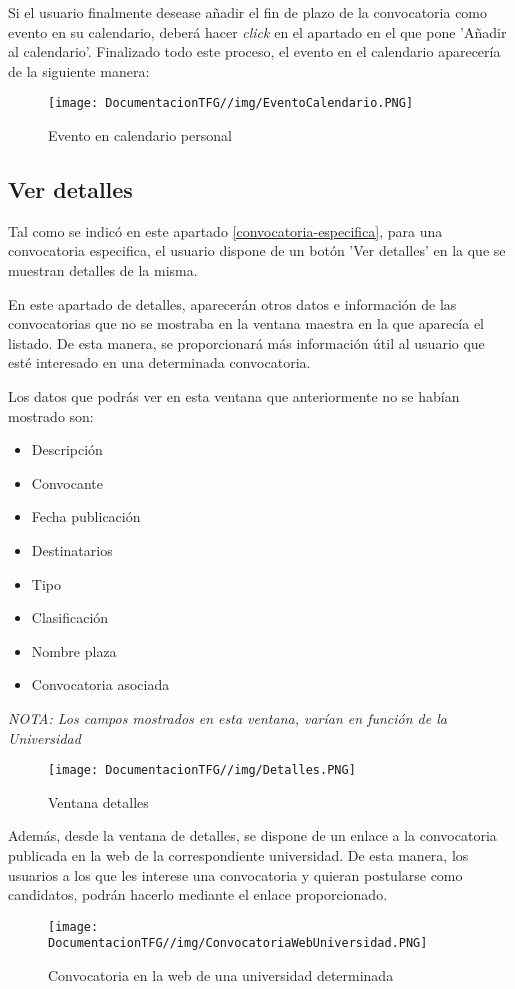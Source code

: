 Si el usuario finalmente desease añadir el fin de plazo de la convocatoria como evento en su calendario, deberá hacer \textit{click} en el apartado en el que pone 'Añadir al calendario'. Finalizado todo este proceso, el evento en el calendario aparecería de la siguiente manera:

\begin{figure}[H]
    \centering
    \texttt{[image: DocumentacionTFG//img/EventoCalendario.PNG]}
    \caption{Evento en calendario personal}
    \label{fig:evento-calendario}
\end{figure}

\subsection{Ver detalles}
Tal como se indicó en este apartado \ref{convocatoria-especifica}, para una convocatoria especifica, el usuario dispone de un botón 'Ver detalles' en la que se muestran detalles de la misma.

En este apartado de detalles, aparecerán otros datos e información de las convocatorias que no se mostraba en la ventana maestra en la que aparecía el listado. De esta manera, se proporcionará más información útil al usuario que esté interesado en una determinada convocatoria.

Los datos que podrás ver en esta ventana que anteriormente no se habían mostrado son:
\begin{itemize}
\item Descripción
\item Convocante
\item Fecha publicación
\item Destinatarios
\item Tipo
\item Clasificación
\item Nombre plaza
\item Convocatoria asociada
\end{itemize}

\textit{NOTA: Los campos mostrados en esta ventana, varían en función de la Universidad}

\begin{figure}[H]
    \centering
    \texttt{[image: DocumentacionTFG//img/Detalles.PNG]}
    \caption{Ventana detalles}
    \label{fig:ventana-detalles}
\end{figure}

Además, desde la ventana de detalles, se dispone de un enlace a la convocatoria publicada en la web de la correspondiente universidad. De esta manera, los usuarios a los que les interese una convocatoria y quieran postularse como candidatos, podrán hacerlo mediante el enlace proporcionado.

\begin{figure}[H]
    \centering
    \texttt{[image: DocumentacionTFG//img/ConvocatoriaWebUniversidad.PNG]}
    \caption{Convocatoria en la web de una universidad determinada}
    \label{fig:convocatoria-web-universidad}
\end{figure}